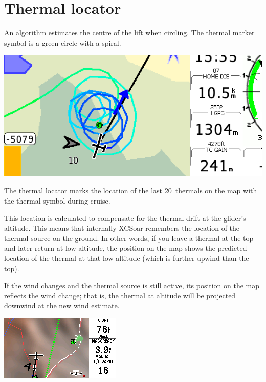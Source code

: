 \section{Thermal locator}
An algorithm estimates the centre of the lift when circling.  The
thermal marker symbol is a green circle with a spiral.

\begin{center}
\includegraphics[angle=0,width=0.8\linewidth,keepaspectratio='true']{figures/shot-tlocator-circling.png}
\end{center}

The thermal locator marks the location of the last
20~thermals on the map with the thermal symbol during cruise.

This location is calculated to compensate for the thermal drift at 
the glider's altitude.  This means that internally XCSoar remembers 
the location of the thermal source on the ground.  In other words, 
if you leave a thermal at the top and later return at low altitude, 
the position on the map shows the predicted location of the thermal 
at that low altitude (which is further upwind than the top).  

If the wind changes and the thermal source is still active, its 
position on the map reflects the wind change; that is, the thermal 
at altitude will be projected downwind at the new wind estimate.

\begin{center}
\includegraphics[angle=0,width=0.8\linewidth,keepaspectratio='true']{figures/shot-tlocator-cruise.png}
\end{center}


